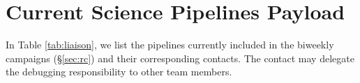 \documentclass[DM,authoryear,toc]{lsstdoc}
\begin{document}
\appendix

\section{Current Science Pipelines Payload}

In Table \ref{tab:liaison}, we list the pipelines currently included
in the biweekly campaigns (\S \ref{sec:rc}) and their corresponding
contacts. The contact may delegate the debugging responsibility to
other team members.



\end{document}
